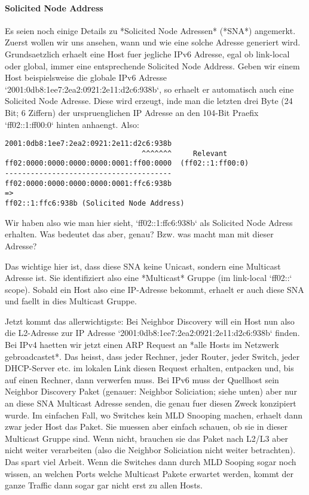 \paragraph{Solicited Node Address} 

Es seien noch einige Details zu *Solicited Node Adressen* (*SNA*)
angemerkt. Zuerst wollen wir uns ansehen, wann und wie eine solche Adresse
generiert wird. Grundsaetzlich erhaelt eine Host fuer jegliche IPv6 Adresse,
egal ob link-local oder global, immer eine entsprechende Solicited Node
Address. Geben wir einem Host beispielsweise die globale IPv6 Adresse
`2001:0db8:1ee7:2ea2:0921:2e11:d2c6:938b`, so erhaelt er automatisch auch eine
Solicited Node Adresse. Diese wird erzeugt, inde man die letzten drei Byte (24
Bit; 6 Ziffern) der urspruenglichen IP Adresse an den 104-Bit Praefix
`ff02::1:ff00:0` hinten anhaengt. Also:

\begin{verbatim}
2001:0db8:1ee7:2ea2:0921:2e11:d2c6:938b
                                ^^^^^^^     Relevant
ff02:0000:0000:0000:0000:0001:ff00:0000  (ff02::1:ff00:0)
---------------------------------------
ff02:0000:0000:0000:0000:0001:ffc6:938b
=>
ff02::1:ffc6:938b (Solicited Node Address)
\end{verbatim}

Wir haben also wie man hier sieht, `ff02::1:ffc6:938b` als Solicited Node Adress
erhalten. Was bedeutet das aber, genau? Bzw. was macht man mit dieser Adresse?

Das wichtige hier ist, dass diese SNA keine Unicast, sondern eine Multicast
Adresse ist. Sie identifiziert also eine *Multicast* Gruppe (im link-local
`ff02::` scope). Sobald ein Host also eine IP-Adresse bekommt, erhaelt er auch
diese SNA und faellt in dies Multicast Gruppe.

Jetzt kommt das allerwichtigste: Bei Neighbor Discovery will ein Host nun also
die L2-Adresse zur IP Adresse `2001:0db8:1ee7:2ea2:0921:2e11:d2c6:938b`
finden. Bei IPv4 haetten wir jetzt einen ARP Request an *alle Hosts im Netzwerk
gebroadcastet*. Das heisst, dass jeder Rechner, jeder Router, jeder Switch,
jeder DHCP-Server etc. im lokalen Link diesen Request erhalten, entpacken und,
bis auf einen Rechner, dann verwerfen muss. Bei IPv6 muss der Quellhost sein
Neighbor Discovery Paket (genauer: Neighbor Soliciation; siehe unten) aber nur
an diese SNA Multicast Adresse senden, die genau fuer diesen Zweck konzipiert
wurde. Im einfachen Fall, wo Switches kein MLD Snooping machen, erhaelt dann
zwar jeder Host das Paket. Sie muessen aber einfach schauen, ob sie in dieser
Multicast Gruppe sind. Wenn nicht, brauchen sie das Paket nach L2/L3 aber nicht
weiter verarbeiten (also die Neighbor Soliciation nicht weiter betrachten). Das
spart viel Arbeit. Wenn die Switches dann durch MLD Sooping sogar noch wissen,
an welchen Ports welche Multicast Pakete erwartet werden, kommt der ganze
Traffic dann sogar gar nicht erst zu allen Hosts.

